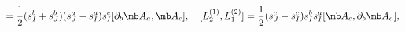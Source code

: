\begin{equation}
[L^{(2)}_{2},L^{(1)}_{1}]=\frac{1}{2}(s^{b}_{I}+s^{b}_{J}) (s^{a}_{J}-s^{a}_{I})s^{c}_{I}[\partial_{b}{\mb A}_{a},{\mb A}_{c}], \quad
[L^{(1)}_{2},L^{(2)}_{1}]=\frac{1}{2}(s^{c}_{J}-s^{c}_{I}) s^{b}_{I}s^{a}_{I}[{\mb A}_{c},\partial_{b}{\mb A}_{a}],
\end{equation}

